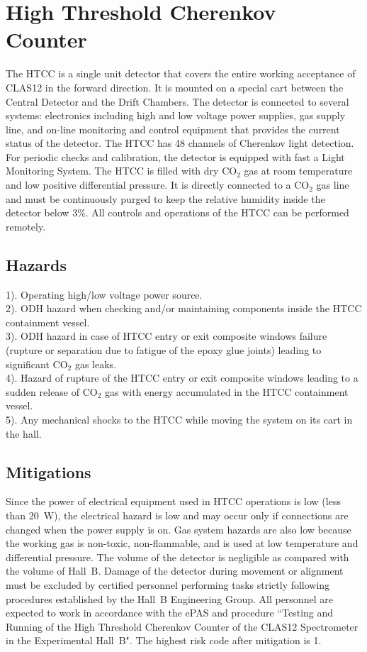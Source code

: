 \section{High Threshold Cherenkov Counter}

The HTCC is a single unit detector that covers the entire working acceptance of CLAS12 
in the forward direction. It is mounted on a special cart between the Central Detector 
and the Drift Chambers. The detector is connected to several systems: electronics including 
high and low voltage power supplies, gas supply line, and on-line monitoring and control 
equipment that provides the current status of the detector. The HTCC has 48 channels of Cherenkov 
light detection. For periodic checks and calibration, the detector is equipped with fast a 
Light Monitoring System. The HTCC is filled with dry CO$_2$ gas at room temperature and 
low positive differential pressure. It is directly connected to a CO$_2$ gas line and must 
be continuously purged to keep the relative humidity inside the detector below 3\%. All 
controls and operations of the HTCC can be performed remotely.
 
\subsection{Hazards} 

1). Operating high/low voltage power source. \\
2). ODH hazard when checking and/or maintaining components inside the HTCC containment vessel.\\
3). ODH hazard in case of HTCC entry or exit composite windows failure (rupture or 
separation due to fatigue of the epoxy glue joints) leading to significant CO$_2$ gas leaks.\\
4). Hazard of rupture of the HTCC entry or exit composite windows leading to a sudden release of 
CO$_2$ gas with energy accumulated in the HTCC containment vessel.\\
5). Any mechanical shocks to the HTCC while moving the system on its cart in the hall.

\subsection{Mitigations}

Since the power of electrical equipment used in HTCC operations is low (less than 20~W), the 
electrical hazard is low and may occur only if connections are changed when the power supply is on.
Gas system hazards are also low because the working gas is non-toxic, non-flammable, and is 
used at low temperature and differential pressure. The volume of the detector is negligible as 
compared with the volume of Hall~B. Damage of the detector during movement or alignment must be 
excluded by certified personnel performing tasks strictly following procedures established by 
the Hall~B Engineering Group. All personnel are expected to work in accordance with the ePAS and
procedure ``Testing and Running of the High Threshold Cherenkov Counter of the CLAS12 Spectrometer
in the Experimental Hall~B". The highest risk code after mitigation is 1.

